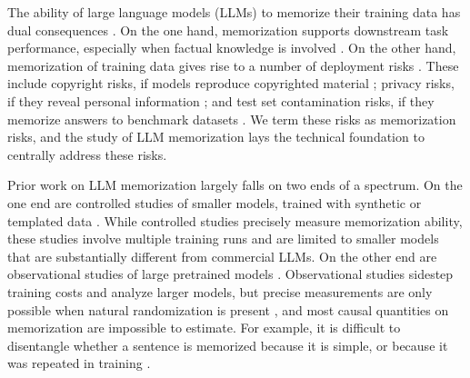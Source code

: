 \documentclass{article} %
\begin{document}
The ability of large language models (LLMs) to memorize their training data has dual consequences \citep[][\textit{inter alia}]{carlini_extracting_2021}. On the one hand, memorization supports downstream task performance, especially when factual knowledge is involved \citep{petroni-etal-2019-language, feldman_what_2020}. On the other hand, memorization of training data gives rise to a number of deployment risks \citep{hartmann2023sokmemorizationgeneralpurposelarge}. These include copyright risks, if models reproduce copyrighted material \citep{foundation_henderson_2023}; privacy risks, if they reveal personal information \citep{DBLP:conf/fat/BrownLMST22}; and test set contamination risks, if they memorize answers to benchmark datasets \citep{magar-schwartz-2022-data}. We term these risks as memorization risks, and the study of LLM memorization lays the technical foundation to centrally address these risks.

Prior work on LLM memorization largely falls on two ends of a spectrum. On the one end are controlled studies of smaller models, trained with synthetic or templated data \citep{zhang_counterfactual_2023, allen-zhu_physics_2024, morris2025languagemodelsmemorize}. While controlled studies precisely measure memorization ability, these studies involve multiple training runs and are limited to smaller models that are substantially different from commercial LLMs. On the other end are observational studies of large pretrained models \citep[e.g.,][\textit{inter alia}]{prashanth2025recite}. Observational studies sidestep training costs and analyze larger models, but precise measurements are only possible when natural randomization is present \citep[as in][]{lesci-etal-2024-causal, wei-etal-2024-proving}, and most causal quantities on memorization are impossible to estimate. For example, it is difficult to disentangle whether a sentence is memorized because it is simple, or because it was repeated in training \citep{huang2024demystifyingverbatimmemorizationlarge}.
\end{document}
